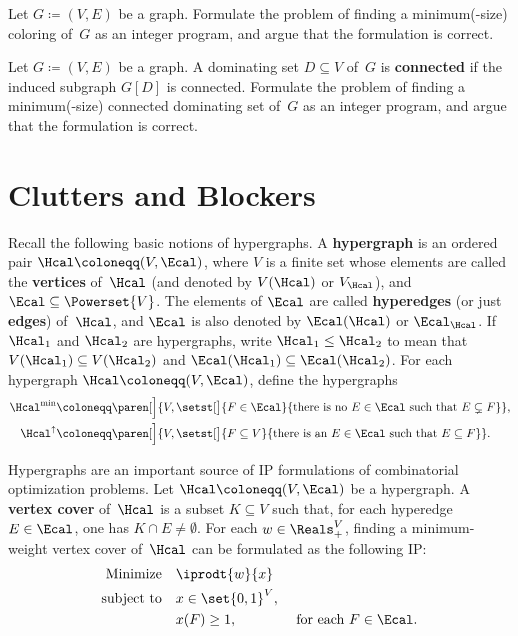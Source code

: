 \documentclass[11pt,leqno,final]{amsart}
\begin{document}
\begin{exercise}
  Let \(G \coloneqq (V,E)\) be a graph.
  Formulate the problem of finding a minimum(-size) coloring of~\(G\)
  as an integer program, and argue that the formulation is correct.
\end{exercise}

\begin{exercise}
  Let \(G \coloneqq (V,E)\) be a graph.
  A dominating set \(D \subseteq V\) of~\(G\) is \textbf{connected} if
  the induced subgraph \(G[D]\) is connected.
  Formulate the problem of finding a minimum(-size) connected
  dominating set of~\(G\) as an integer program, and argue that the
  formulation is correct.
\end{exercise}

\section{Clutters and Blockers}

Recall the following basic notions of hypergraphs.
A \textbf{hypergraph} is an ordered pair
\(\Hcal \coloneqq (V,\Ecal)\), where \(V\) is a finite set whose
elements are called the \textbf{vertices} of~\(\Hcal\) (and denoted by
\(V(\Hcal)\) or \(V_{\Hcal}\)), and \(\Ecal \subseteq \Powerset{V}\).
The elements of \(\Ecal\) are called \textbf{hyperedges} (or just
\textbf{edges}) of~\(\Hcal\), and \(\Ecal\) is also denoted by
\(\Ecal(\Hcal)\) or \(\Ecal_{\Hcal}\).
If \(\Hcal_1\) and \(\Hcal_2\) are hypergraphs, write
\(\Hcal_1 \leq \Hcal_2\) to mean that
\(V(\Hcal_1) \subseteq V(\Hcal_2)\) and
\(\Ecal(\Hcal_1) \subseteq \Ecal(\Hcal_2)\).
For each hypergraph \(\Hcal \coloneqq (V,\Ecal)\), define the
hypergraphs
\begin{align*}
  \Hcal^{\min}
  & \coloneqq
  \paren[\Big]{
  V,
  \setst[\big]{F \in \Ecal}{\text{there is no \(E \in \Ecal\) such that
    \(E \subsetneq F\)}}
  },
  \\
  \Hcal^{\uparrow}
  & \coloneqq
  \paren[\Big]{
  V,
  \setst[\big]{F \subseteq V}{\text{there is an \(E \in \Ecal\) such that
    \(E \subseteq F\)}}
  }.
\end{align*}

Hypergraphs are an important source of IP formulations of
combinatorial optimization problems.
Let \(\Hcal \coloneqq (V,\Ecal)\) be a hypergraph.
A \textbf{vertex cover} of~\(\Hcal\) is a subset \(K \subseteq V\)
such that, for each hyperedge \(E \in \Ecal\), one has
\(K \cap E \neq \emptyset\).
For each \(w \in \Reals_+^V\), finding a minimum-weight vertex cover
of~\(\Hcal\) can be formulated as the following IP:
\begin{alignat*}{3}
  \text{Minimize} \quad
  & \iprodt{w}{x} &
  \\[0pt]
  \text{subject to}\quad
  & x \in \set{0,1}^V, &
  \\[0pt]
  & x(F) \geq 1, & \text{ for each }F \in \Ecal.
\end{alignat*}
\end{document}
